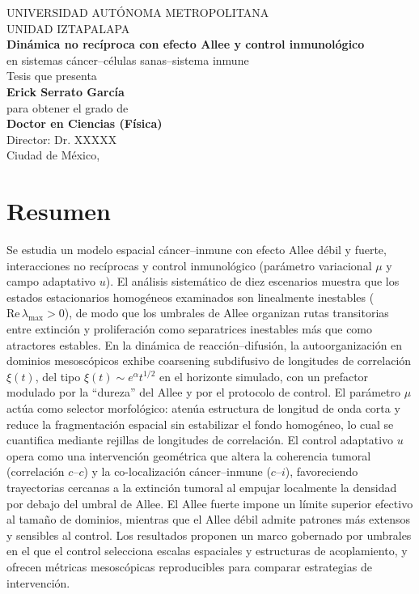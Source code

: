 \documentclass[12pt,oneside]{report}
\begin{document}
\begin{titlepage}
\centering
{\Large UNIVERSIDAD AUTÓNOMA METROPOLITANA\\}
{\Large UNIDAD IZTAPALAPA\\}
\vspace{2cm}
{\huge\bfseries Dinámica no recíproca con efecto Allee y control inmunológico\\}
\vspace{1cm}
{\Large en sistemas cáncer--células sanas--sistema inmune\\}
\vspace{2cm}
{\Large Tesis que presenta\\}
{\Large\bfseries Erick Serrato García\\}
\vfill
{\Large para obtener el grado de\\}
{\Large\bfseries Doctor en Ciencias (Física)\\}
\vspace{1cm}
{\Large Director: Dr. XXXXX\\}
\vspace{1cm}
{\Large Ciudad de México, \the\year}
\end{titlepage}


\chapter*{Resumen}

Se estudia un modelo espacial cáncer--inmune con efecto Allee débil y fuerte, interacciones no recíprocas y control inmunológico (parámetro variacional $\mu$ y campo adaptativo $u$). El análisis sistemático de diez escenarios muestra que los estados estacionarios homogéneos examinados son linealmente inestables ($\mathrm{Re}\,\lambda_{\max}>0$), de modo que los umbrales de Allee organizan rutas transitorias entre extinción y proliferación como separatrices inestables más que como atractores estables. En la dinámica de reacción--difusión, la autoorganización en dominios mesoscópicos exhibe coarsening subdifusivo de longitudes de correlación $\xi(t)$, del tipo $\xi(t)\sim e^{\alpha}t^{1/2}$ en el horizonte simulado, con un prefactor modulado por la ``dureza'' del Allee y por el protocolo de control. El parámetro $\mu$ actúa como selector morfológico: atenúa estructura de longitud de onda corta y reduce la fragmentación espacial sin estabilizar el fondo homogéneo, lo cual se cuantifica mediante rejillas de longitudes de correlación. El control adaptativo $u$ opera como una intervención geométrica que altera la coherencia tumoral (correlación $c$--$c$) y la co-localización cáncer--inmune ($c$--$i$), favoreciendo trayectorias cercanas a la extinción tumoral al empujar localmente la densidad por debajo del umbral de Allee. El Allee fuerte impone un límite superior efectivo al tamaño de dominios, mientras que el Allee débil admite patrones más extensos y sensibles al control. Los resultados proponen un marco gobernado por umbrales en el que el control selecciona escalas espaciales y estructuras de acoplamiento, y ofrecen métricas mesoscópicas reproducibles para comparar estrategias de intervención.
\end{document}
